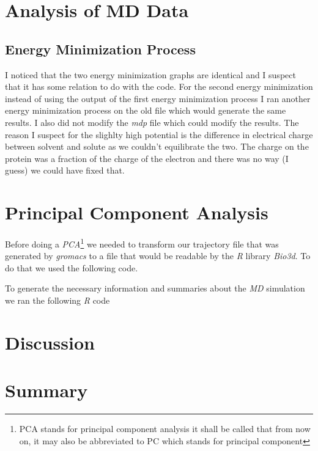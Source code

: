 \documentclass{article}
\begin{document}
 
 \section{Analysis of MD Data}
 \label{analMD}
 \subsection{Energy Minimization Process}
 	I noticed that the two energy minimization graphs are identical and I suspect that it has some relation to do with the code. For the second energy minimization instead of using the output of the first energy minimization process I ran another energy minimization process on the old file which would generate the same results. I also did not modify the \emph{mdp} file which could modify the results. The reason I suspect for the slighlty high potential is the difference in electrical charge between solvent and solute as we couldn't equilibrate the two. The charge on the protein was a fraction of the charge of the electron and there was no way (I guess) we could have fixed that.

 \section{Principal Component Analysis}
 \label{pca}
 Before doing a \emph{PCA}\footnote{PCA stands for principal component analysis it shall be called that from now on, it may also be abbreviated to PC which stands for principal component} we needed to transform our trajectory file that was generated by \emph{gromacs} to a file that would be readable by the \emph{R} library \emph{Bio3d}. To do that we used the following code.
 

 To generate the necessary information and summaries about the \emph{MD} simulation we ran the following \emph{R} code
 



 \section{Discussion} %
 \label{sec:disc}



 \section{Summary}
 \label{sec:sum}
 
 
\end{document}

